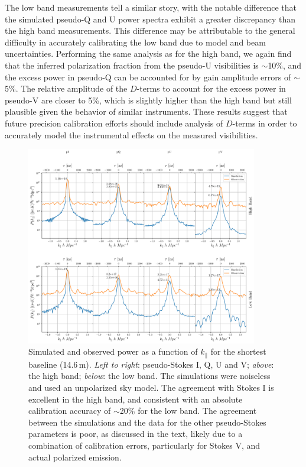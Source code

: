 \documentclass[twocolumn, trackchanges]{aastex61}
\begin{document}
The low band measurements tell a similar story, with the notable difference that
the simulated pseudo-Q and U power spectra exhibit a greater discrepancy than
the high band measurements.  This difference may be attributable to the general
difficulty in accurately calibrating the low band due to model and beam
uncertainties.  Performing the same analysis as for the high band, we again find
that the inferred polarization fraction from the pseudo-U visibilities is
$\sim$10\%, and the excess power in pseudo-Q can be accounted for by gain
amplitude errors of $\sim$5\%. The relative amplitude of the $D$-terms to
account for the excess power in pseudo-V are closer to 5\%, which is slightly
higher than the high band but still plausible given the behavior of similar
instruments. These results suggest that future precision calibration efforts
should include analysis of $D$-terms in order to accurately model the
instrumental effects on the measured visibilities.

\begin{figure}[h]
\centering
\includegraphics[width=0.9\textwidth]{real_sim_compare_noinset.pdf}
\caption{Simulated and observed power as a function of $k_{\parallel}$ for the
  shortest baseline (14.6\,m). \textit{Left to right}: pseudo-Stokes I, Q, U and
  V; \textit{above}: the high band; \textit{below}: the low band. The
  simulations were noiseless and used an unpolarized sky model. The agreement
  with Stokes I is excellent in the high band, and consistent with an absolute
  calibration accuracy of $\sim$20\% for the low band.  The agreement between
  the simulations and the data for the other pseudo-Stokes parameters is poor,
  as discussed in the text, likely due to a combination of calibration errors,
  particularly for Stokes V, and actual polarized emission.}
\label{fig:bl0_cuts_vs_sim}
\end{figure}
\end{document}
